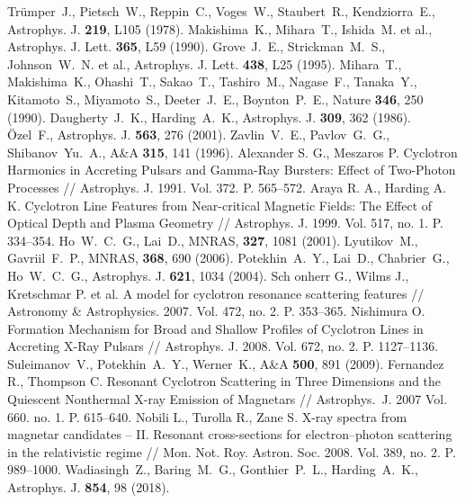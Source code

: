 \documentclass[14pt, russian]{article}
\begin{document}

\begin{thebibliography}{}
Tr\"{u}mper~J., Pietsch~W., Reppin~C., Voges~W., Staubert~R., Kendziorra~E., Astrophys. J. {\bf 219}, L105 (1978).
%
Makishima~K., Mihara~T., Ishida~M. et al., Astrophys. J. Lett. {\bf 365}, L59 (1990).
%
Grove~J.~E., Strickman~M.~S., Johnson~W.~N. et al., Astrophys. J. Lett. {\bf 438}, L25 (1995).
%
Mihara~T., Makishima~K., Ohashi~T., Sakao~T., Tashiro~M., Nagase~F., Tanaka~Y., Kitamoto~S., Miyamoto~S., Deeter~J.~E., 
Boynton~P.~E., Nature {\bf 346}, 250 (1990).
%
Daugherty~J.~K., Harding~A.~K., Astrophys. J. {\bf 309}, 362 (1986).
%
{\"O}zel~F., Astrophys. J. {\bf 563}, 276 (2001).
%
Zavlin~V.~E., Pavlov~G.~G., Shibanov~Yu.~A., A\&A {\bf 315}, 141 (1996).
%
Alexander S. G., Meszaros P. Cyclotron Harmonics in Accreting Pulsars and
Gamma-Ray Bursters: Effect of Two-Photon Processes // Astrophys. J. 1991.
Vol. 372. P. 565–572.
%
Araya R. A., Harding A. K. Cyclotron Line Features from Near-critical Magnetic
Fields: The Effect of Optical Depth and Plasma Geometry // Astrophys.
J. 1999. Vol. 517, no. 1. P. 334–354.
%
Ho~W.~C.~G., Lai~D., MNRAS, {\bf 327}, 1081 (2001).
%
Lyutikov~M., Gavriil~F.~P., MNRAS, {\bf 368}, 690 (2006).
%
Potekhin~A.~Y., Lai~D., Chabrier~G., Ho~W.~C.~G., Astrophys. J. {\bf 621}, 1034 (2004).
%
Sch	onherr G., Wilms J., Kretschmar P. et al. A model for cyclotron resonance
scattering features // Astronomy \& Astrophysics. 2007. Vol. 472, no. 2.
P. 353–365.
%
Nishimura O. Formation Mechanism for Broad and Shallow Profiles of Cyclotron
Lines in Accreting X-Ray Pulsars // Astrophys. J. 2008. Vol. 672,
no. 2. P. 1127–1136.
%
Suleimanov~V., Potekhin~A.~Y., Werner~K., A{\&}A {\bf 500}, 891 (2009).
%
Fernandez R., Thompson C. Resonant Cyclotron Scattering in Three Dimensions and the Quiescent Nonthermal X-ray Emission of Magnetars // Astrophys.~J. 2007 Vol. 660. no. 1. P. 615--640.
%
Nobili L., Turolla R., Zane S. X-ray spectra from magnetar candidates –
II. Resonant cross-sections for electron–photon scattering in the relativistic
regime // Mon. Not. Roy. Astron. Soc. 2008. Vol. 389, no. 2. P. 989–1000.
%
Wadiasingh~Z., Baring~M.~G., Gonthier~P.~L., Harding~A.~K., Astrophys. J. {\bf 854}, 98 (2018).

\end{thebibliography}
\end{document}
